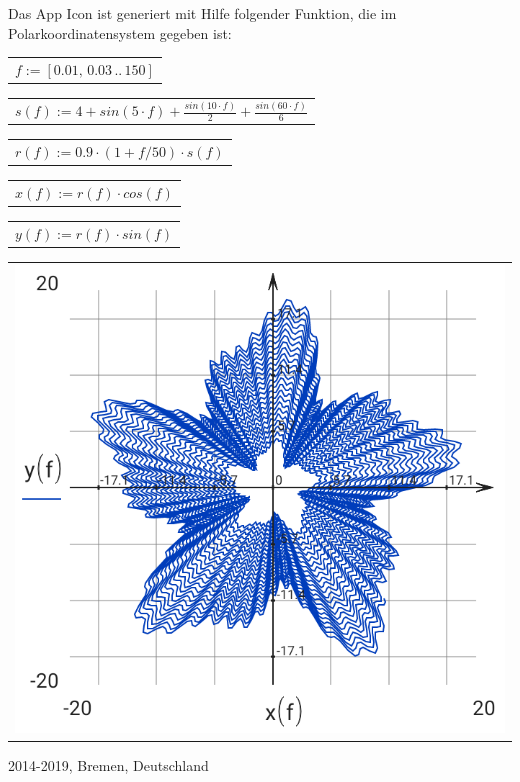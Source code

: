 \documentclass[DIV=calc, paper=a4, fontsize=11pt, twocolumn]{scrartcl}
\begin{document}
Das App Icon ist generiert mit Hilfe
folgender Funktion, die im
Polarkoordinatensystem gegeben ist:
\begin{center}\begin{tabular}{c}
  $f := \left[ 0.01,\, 0.03 \,..\, 150 \right]$
\end{tabular}\end{center}
\begin{center}\begin{tabular}{c}
  $s(f) := 4 + sin \left( 5 \cdot f\right)  + \frac{sin \left( 10 \cdot f\right) }{2} + \frac{sin \left( 60 \cdot f\right) }{6}$
\end{tabular}\end{center}
\begin{center}\begin{tabular}{c}
  $r(f) := 0.9 \cdot \left( 1 + f / 50 \right) \cdot s \left( f\right) $
\end{tabular}\end{center}
\begin{center}\begin{tabular}{c}
  $x(f) := r \left( f\right)  \cdot cos \left( f\right) $
\end{tabular}\end{center}
\begin{center}\begin{tabular}{c}
  $y(f) := r \left( f\right)  \cdot sin \left( f\right) $
\end{tabular}\end{center}
\begin{center}\begin{tabular}{c} \includegraphics[resolution=320]{graphics/about_micromath_fig1.png} \end{tabular}\end{center}

2014-2019, Bremen, Deutschland
\end{document}
